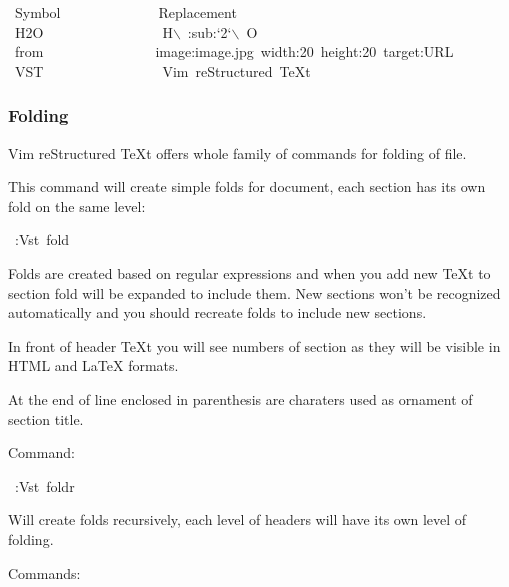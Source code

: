 \documentclass[12pt]{article}
\begin{document}
\begin{ttfamily}\begin{flushleft}
\mbox{~Symbol~~~~~~~~~~~~~~Replacement}\\
\mbox{~H2O~~~~~~~~~~~~~~~~~H$\backslash$~:sub:`2`$\backslash$~O}\\
\mbox{~from~~~~~~~~~~~~~~~~image:image.jpg~width:20~height:20~target:URL}\\
\mbox{~VST~~~~~~~~~~~~~~~~~Vim~reStructured~\TeX{}t}\\
\end{flushleft}\end{ttfamily}

\hypertarget{lfolding}{}
\subsubsection{Folding}

Vim reStructured \TeX{}t offers whole family of commands for folding of file.

This command will create simple folds for document, each section has its own
fold on the same level:

\begin{ttfamily}\begin{flushleft}
\mbox{~:Vst~fold}\\
\end{flushleft}\end{ttfamily}

Folds are created based on regular expressions and when you add new \TeX{}t to
section fold will be expanded to include them. New sections won't be
recognized automatically and you should recreate folds to include new
sections.

In front of header \TeX{}t you will see numbers of section as they will be
visible in HTML and \LaTeX{} formats.

At the end of line enclosed in parenthesis are charaters used as ornament of
section title.

Command:

\begin{ttfamily}\begin{flushleft}
\mbox{~:Vst~foldr}\\
\end{flushleft}\end{ttfamily}

Will create folds recursively, each level of headers will have its own level
of folding.

Commands:
\end{document}
